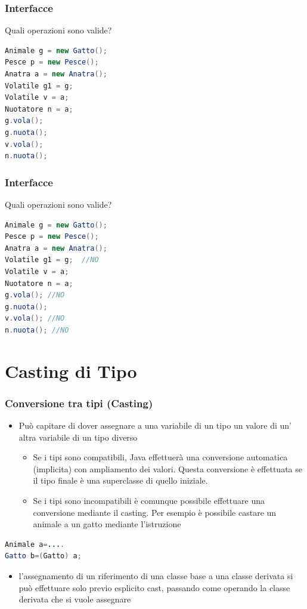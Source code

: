 \documentclass{beamer}
\begin{document}
\begin{frame}[fragile]
\frametitle{Interfacce}
Quali operazioni sono valide?
\begin{lstlisting}[language=Java,escapechar=|]
Animale g = new Gatto(); 
Pesce p = new Pesce(); 
Anatra a = new Anatra(); 
Volatile g1 = g; 
Volatile v = a;
Nuotatore n = a;
g.vola();
g.nuota();
v.vola();
n.nuota();
\end{lstlisting}
\end{frame}

\begin{frame}[fragile]
\frametitle{Interfacce}
Quali operazioni sono valide?
\begin{lstlisting}[language=Java,escapechar=|]
Animale g = new Gatto(); 
Pesce p = new Pesce(); 
Anatra a = new Anatra(); 
Volatile g1 = g;  //NO
Volatile v = a;
Nuotatore n = a;
g.vola(); //NO
g.nuota();
v.vola(); //NO
n.nuota(); //NO
\end{lstlisting}
\end{frame}

\section{Casting di Tipo}
\begin{frame}[fragile]
\frametitle{Conversione tra tipi (Casting)}
\begin{itemize}
\item Pu\`o capitare di dover assegnare a una variabile di un tipo un valore di un' altra variabile di un tipo diverso
\begin{itemize}
\item Se i tipi sono compatibili, Java effettuerà una conversione automatica (implicita) con ampliamento dei valori. Questa conversione \`e effettuata se il tipo finale \`e una superclasse di quello iniziale. 
\item Se i tipi sono incompatibili \`e comunque possibile effettuare una conversione mediante il casting. Per esempio \`e possibile castare un animale a un gatto mediante l'istruzione
\end{itemize}

\end{itemize}
\begin{lstlisting}[language=Java,escapechar=|]
Animale a=....
Gatto b=(Gatto) a;
\end{lstlisting}
\begin{itemize}
 \item l'assegnamento di un riferimento di una classe base a una classe derivata si pu\`o effettuare solo previo esplicito cast, passando come operando la classe derivata che si vuole assegnare
\end{itemize}
\end{frame}
\end{document}

